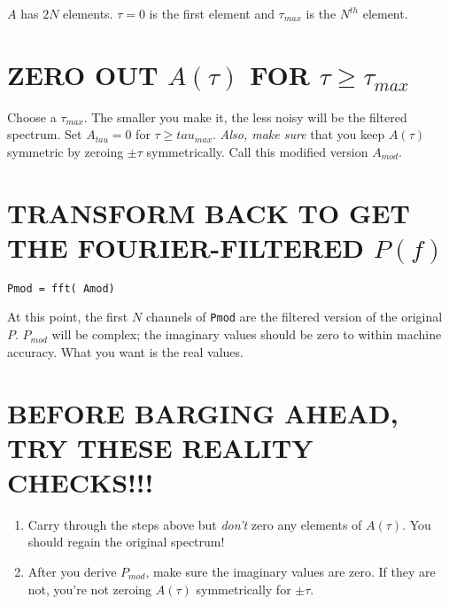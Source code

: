 \documentclass[preprint]{aastex}
\begin{document}
\noindent $A$ has $2N$ elements. $\tau=0$ is the first element and
$\tau_{max}$ is the $N^{th}$ element.

\section{ZERO OUT $A(\tau)$ FOR $\tau \ge \tau_{max}$}

Choose a $\tau_{max}$. The smaller you make it, the less noisy will be the
filtered spectrum. Set $A_{tau}=0$ for $\tau \ge tau_{max}$. {\it Also,
  make sure} that you keep $A(\tau)$ symmetric by zeroing $\pm \tau$
  symmetrically. Call this
  modified version $A_{mod}$.

\section{TRANSFORM BACK TO GET THE FOURIER-FILTERED $P(f)$}

\begin{verbatim}
Pmod = fft( Amod)
\end{verbatim}

\noindent At this point, the first $N$ channels of {\tt Pmod}
are the filtered version of the original $P$. $P_{mod}$ will be complex;
the imaginary values should be zero to within machine accuracy. What you
want is the real values.

\section{BEFORE BARGING AHEAD, TRY THESE REALITY CHECKS!!!}

\begin{enumerate}

\item Carry through the steps above but {\it don't} zero any
elements of $A(\tau)$. You should regain the original spectrum!

\item After you derive $P_{mod}$, make sure the imaginary values are
  zero. If they are not, you're not zeroing $A(\tau)$ symmetrically for
  $\pm \tau$.
\end{enumerate}
\end{document}
